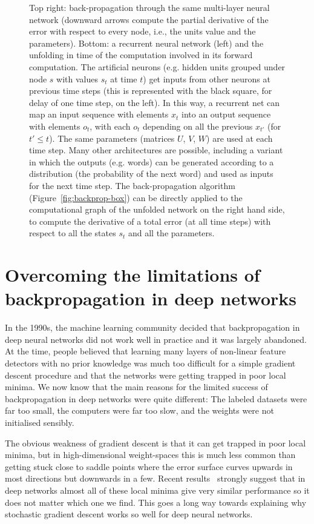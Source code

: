 \documentclass[]{article}
\begin{document}
\begin{figure}[H]
{\begin{minipage}{\textwidth}
{Top right: back-propagation through the same multi-layer neural network
(downward arrows compute the partial derivative of the error with respect
to every node, i.e., the units value and the parameters).\newline
Bottom: a recurrent neural network (left) and the unfolding in time of the
computation involved in its forward computation. The artificial neurons
(e.g. hidden units grouped under node $s$ with values $s_t$ at time $t$) 
get inputs from other neurons at previous time steps
(this is represented with the black square, for delay of
one time step, on the left). In this way, a recurrent net can map an input sequence
with elements $x_t$ into an output sequence with elements $o_t$, with
each $o_t$ depending on all the previous $x_{t'}$ (for $t'\leq t$). The
same parameters (matrices $U$, $V$, $W$) are used at each time step.
Many other architectures are possible, including a variant in which
the outputs (e.g. words) can be generated according to a distribution 
(the probability of the next word) and used as inputs for the next time step.
The back-propagation algorithm (Figure~\ref{fig:backprop-box})
can be directly applied to the computational graph of the unfolded network
on the right hand side, to compute the derivative of a total error
(at all time steps) with respect to all the states $s_t$ and all the parameters.
}
\end{minipage}
}
\label{fig:mlp}
\end{figure}

\section{Overcoming the limitations of backpropagation in deep networks}

In the 1990s, the machine learning community decided that backpropagation
in deep neural networks did not work well in practice and it was largely
abandoned.  At the time, people believed that learning many layers of
non-linear feature detectors with no prior knowledge was much too difficult
for a simple gradient descent procedure and that the networks were getting
trapped in poor local minima. We now know that the main reasons for the
limited success of backpropagation in deep networks were quite different:
The labeled datasets were far too small, the computers were far too slow,
and the weights were not initialised sensibly.

The obvious weakness of gradient descent is that it can get trapped in poor
local minima, but in high-dimensional weight-spaces this is much less
common than getting stuck close to saddle points where the error surface
curves upwards in most directions but downwards in a few. Recent
results~\citep{Dauphin-et-al-NIPS2014-small,Choromanska-et-al-arxiv2014} strongly suggest
that in deep networks almost all of these local minima give very similar
performance so it does not matter which one we find.  This goes a long way
towards explaining why stochastic gradient descent works so well for deep
neural networks.
\end{document}
